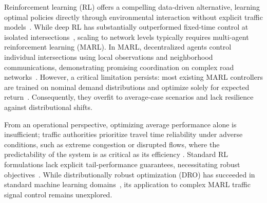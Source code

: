 \documentclass[lettersize,journal]{IEEEtran}
\begin{document}
Reinforcement learning (RL) offers a compelling data-driven alternative, learning optimal policies directly through environmental interaction without explicit traffic models~\cite{sutton1998reinforcement}. While deep RL has substantially outperformed fixed-time control at isolated intersections~\cite{huang2023reinforcement}, scaling to network levels typically requires multi-agent reinforcement learning (MARL). In MARL, decentralized agents control individual intersections using local observations and neighborhood communications, demonstrating promising coordination on complex road networks~\cite{zhang2023learning}. However, a critical limitation persists: most existing MARL controllers are trained on nominal demand distributions and optimize solely for expected return~\cite{bukharin2023robust}. Consequently, they overfit to average-case scenarios and lack resilience against distributional shifts.

From an operational perspective, optimizing average performance alone is insufficient; traffic authorities prioritize travel time reliability under adverse conditions, such as extreme congestion or disrupted flows, where the predictability of the system is as critical as its efficiency \cite{jose2020travel}. Standard RL formulations lack explicit tail-performance guarantees, necessitating robust objectives~\cite{sagawa2020gdro}. While distributionally robust optimization (DRO) has succeeded in standard machine learning domains~\cite{sagawa2020gdro,hashimoto2018fairness}, its application to complex MARL traffic signal control remains unexplored. 
\end{document}
